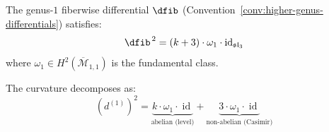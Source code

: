 \begin{theorem}
\label{thm:sl3-genus1-curvature}
The genus-$1$ fiberwise differential
$\dfib$ \textup{(}Convention~\textup{\ref{conv:higher-genus-differentials})} satisfies:
\begin{equation}\label{eq:sl3-genus1-dsquared}
\dfib^{\,2} = (k+3) \cdot \omega_1 \cdot \operatorname{id}_{\mathfrak{sl}_3}
\end{equation}
where $\omega_1 \in H^2(\overline{\mathcal{M}}_{1,1})$ is the fundamental class.

The curvature decomposes as:
\begin{equation}\label{eq:sl3-curvature-decomposition}
(d^{(1)})^2 = \underbrace{k \cdot \omega_1 \cdot \operatorname{id}}_{\text{abelian (level)}} + \underbrace{3 \cdot \omega_1 \cdot \operatorname{id}}_{\text{non-abelian (Casimir)}}
\end{equation}
\end{theorem}

